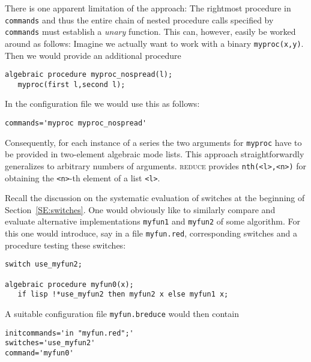 \documentclass[a4paper]{article}
\begin{document}
There is one apparent limitation of the approach: The rightmost
procedure in \texttt{commands} and thus the entire chain of nested
procedure calls specified by \texttt{commands} must establish a
\emph{unary} function. This can, however, easily be worked around as
follows: Imagine we actually want to work with a binary
\texttt{myproc(x,y)}. Then we would provide an additional procedure
\begin{verbatim}
algebraic procedure myproc_nospread(l);
   myproc(first l,second l);
\end{verbatim}
In the configuration file we would use this as follows:
\begin{verbatim}
commands='myproc myproc_nospread'
\end{verbatim}
Consequently, for each instance of a series the two arguments for
\texttt{myproc} have to be provided in two-element algebraic mode
lists. This approach straightforwardly generalizes to arbitrary
numbers of arguments. \textsc{reduce} provides \texttt{nth(<l>,<n>)}
for obtaining the \texttt{<n>}-th element of a list \texttt{<l>}.

Recall the discussion on the systematic evaluation of switches at the
beginning of Section~\ref{SE:switches}. One would obviously like to
similarly compare and evaluate alternative implementations
\texttt{myfun1} and \texttt{myfun2} of some algorithm. For this one
would introduce, say in a file \texttt{myfun.red}, corresponding
switches and a procedure testing these switches:
\begin{verbatim}
switch use_myfun2;

algebraic procedure myfun0(x);
   if lisp !*use_myfun2 then myfun2 x else myfun1 x;
\end{verbatim}
A suitable configuration file \texttt{myfun.breduce} would then
contain
\begin{verbatim}
initcommands='in "myfun.red";'
switches='use_myfun2'
command='myfun0'
\end{verbatim}
\end{document}
